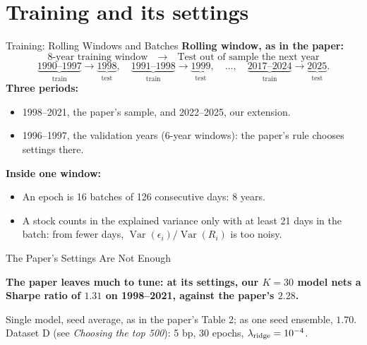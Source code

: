 \documentclass[11pt]{beamer}
\newcommand{\src}[1]{%
  \par\vfill
  {\fontsize{6.4}{7.6}\selectfont\color{Muted}#1\par}
}
\newcommand{\claim}[1]{%
  \par{\color{SBred}\bfseries #1\par}
}
\newcommand{\Var}{\operatorname{Var}}
\newcommand{\titlepageframe}[1]{%
  \begin{frame}{\phantom{Section}}
  \vfill
  \centering
  {\color{SBred}\LARGE\bfseries\secname\par}
  \medskip
  {\color{SBred}\large#1\par}
  \vfill\vfill
  \hfill{\setbeamerfont{button}{size=\footnotesize}\hyperlink{contents}{\beamerreturnbutton{Contents}}}
  \end{frame}
}
\newcommand{\sectiontitlepage}[1][\strut]{\titlepageframe{#1}}
\renewcommand{\src}[1]{%
  \par\vfill
  {\fontsize{6.4}{7.6}\selectfont#1\par}
}
\begin{document}
\section{Training and its settings}
\sectiontitlepage

\begin{frame}{Training: Rolling Windows and Batches}
\textbf{Rolling window, as in the paper:}
\[
\text{8-year training window}
\quad\longrightarrow\quad
\text{Test out of sample the next year}
\]
{\small\[
\underbrace{1990\text{--}1997}_{\text{train}}\rightarrow\underbrace{1998}_{\text{test}},
\quad
\underbrace{1991\text{--}1998}_{\text{train}}\rightarrow\underbrace{1999}_{\text{test}},
\quad\ldots,\quad
\underbrace{2017\text{--}2024}_{\text{train}}\rightarrow\underbrace{2025}_{\text{test}}.
\]}%
\textbf{Three periods:}
\begin{itemize}
\item 1998--2021, the paper's sample, and 2022--2025, our extension.
\item 1996--1997, the validation years (6-year windows): the paper's rule chooses settings there.
\end{itemize}
\textbf{Inside one window:}
\begin{itemize}
\item An epoch is 16 batches of 126 consecutive days: 8 years.
\item A stock counts in the explained variance only with at least 21 days in the batch:
      from fewer days, $\Var(\epsilon_i)/\Var(R_i)$ is too noisy.
\end{itemize}
\end{frame}

\begin{frame}{The Paper's Settings Are Not Enough}
\vfill
\claim{The paper leaves much to tune: at its settings, our $K=30$ model nets a Sharpe ratio of $1.31$ on 1998--2021, against the paper's $2.28$.}
\vfill
\src{Single model, seed average, as in the paper's Table 2; as one seed ensemble, $1.70$.
Dataset D (see \emph{Choosing the top 500}): 5 bp, 30 epochs, $\lambda_{\rm ridge}=10^{-4}$.}
\end{frame}
\end{document}
